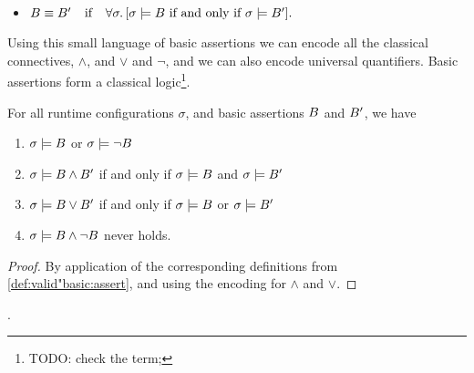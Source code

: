 \begin{definition} 
$ ~ $ 

\begin{itemize}
\item
$B \equiv B'  {{\hspace{.1in}} {\mbox{ if }} {\hspace{.1in}}}    \forall \sigma.\, [\sigma \models B \mbox{ if and only if } \sigma \models B'].$
\end{itemize}
\end{definition}

Using this small language of basic assertions we can encode all the classical connectives, \ie $\wedge$, and $\vee$ and $\neg$, and we can also encode universal quantifiers. Basic assertions form a classical logic\footnote{TODO: check the term;}.

\begin{lemma}
For all runtime configurations $\sigma$, and basic assertions $B$ and $B'$, we have
\begin{enumerate}
\item 
$\sigma \models B$ or $\sigma \models \neg B$
\item
$\sigma \models B \wedge B'$ \SP if and only if \SP $\sigma \models B$ and  $\sigma \models B'$ 
\item
$\sigma \models B \vee B'$ \SP if and only if \SP $\sigma \models B$ or  $\sigma \models B'$ 
\item
$\sigma \models B \wedge \neg B$ never holds.
\end{enumerate}
\end{lemma}
\begin{proof} By application of the corresponding definitions from \ref{def:valid"basic:assert}, and using the encoding for 
$\wedge$ and $\vee$. \end{proof}.

